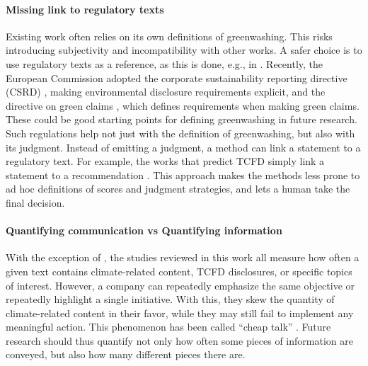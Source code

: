 \paragraph{Missing link to regulatory texts} Existing work often relies on its own definitions of greenwashing. This risks introducing subjectivity and incompatibility with other works. A safer choice is to use 
regulatory texts as a reference, %
as this is done, e.g., in \citet{stammbach_environmental_2023}.
Recently, the European Commission adopted the corporate sustainability reporting directive (CSRD) \cite{csrd2022}, making environmental disclosure requirements explicit, and the directive on green claims \cite{eugreenclaims}, which defines requirements when making green claims. These could be good starting points for defining greenwashing in future research.
Such regulations help not just with the definition of greenwashing, but also with its judgment. Instead of emitting a judgment, a method can link a statement to a regulatory text. For example, the works that predict TCFD simply link a statement to a recommendation \cite{dingCarbonEmissionsTCFD2023, auzepy_evaluating_2023, bjarne_brie_mandatory_2022, bingler_cheap_2021, sampson_tcfd-nlp_nodate}. This approach makes the methods less prone to ad hoc definitions of scores and judgment strategies, and lets a human take the final decision. 

\paragraph{Quantifying communication vs Quantifying information} With the exception of \citet{bronzini_glitter_2023}, the studies reviewed in this work all measure how often a given text contains climate-related content, TCFD disclosures, or specific topics of interest. However, a company can repeatedly emphasize the same objective or repeatedly highlight a single initiative. With this, they skew the quantity of climate-related content in their favor, while they may still fail to implement any meaningful action. This phenomenon has been called  ``cheap talk'' \cite{bingler2023cheaptalkspecificitysentiment}.
Future research should thus quantify not only how often some pieces of information are conveyed, but also how many different pieces there are. 
